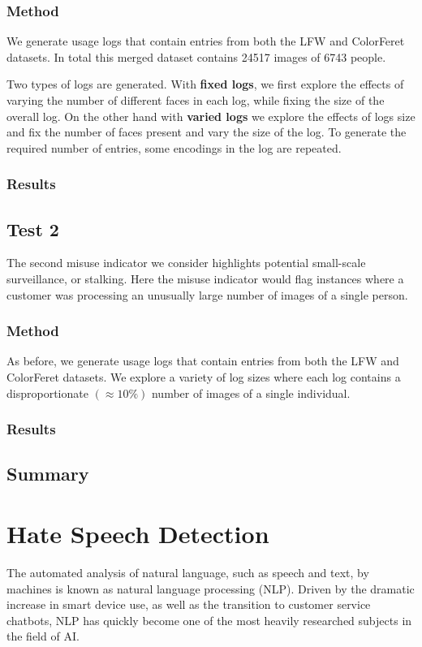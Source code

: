 \documentclass[a4paper,12pt]{report}
\begin{document}
	\subsection{Method}
	We generate usage logs that contain entries from both the LFW and ColorFeret datasets. In total this merged dataset contains 24517 images of 6743 people.
	
	Two types of logs are generated. With \textbf{fixed logs}, we first explore the effects of varying the number of different faces in each log, while fixing the size of the overall log. On the other hand with \textbf{varied logs} we explore the effects of logs size and fix the number of faces present and vary the size of the log. To generate the required number of entries, some encodings in the log are repeated.
	
	\subsection{Results}
	
	\section{Test 2}
	The second misuse indicator we consider highlights potential small-scale surveillance, or stalking. Here the misuse indicator would flag instances where a customer was processing an unusually large number of images of a single person.
	
	\subsection{Method}
	As before, we generate usage logs that contain entries from both the LFW and ColorFeret datasets. We explore a variety of log sizes where each log contains a disproportionate $(\approx 10\%)$ number of images of a single individual. 
	
	\subsection{Results}
	
	\section{Summary}
	
	\chapter{Hate Speech Detection}
	The automated analysis of natural language, such as speech and text, by machines is known as natural language processing (NLP). Driven by the dramatic increase in smart device use, as well as the transition to customer service chatbots, NLP has quickly become one of the most heavily researched subjects in the field of AI. 
	
\end{document}
